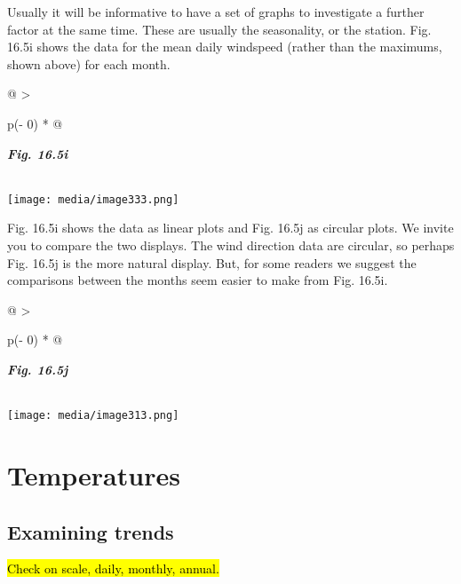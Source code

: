 \documentclass[
  letterpaper,
  DIV=11,
  numbers=noendperiod]{scrreprt}
\begin{document}
Usually it will be informative to have a set of graphs to investigate a
further factor at the same time. These are usually the seasonality, or
the station. Fig. 16.5i shows the data for the mean daily windspeed
(rather than the maximums, shown above) for each month.

\begin{longtable}[]{@{}
  >{\raggedright\arraybackslash}p{(\columnwidth - 0\tabcolsep) * }@{}}
\toprule\noalign{}
\begin{minipage}[b]{\linewidth}\raggedright
\textbf{\emph{Fig. 16.5i}}
\end{minipage} \\
\midrule\noalign{}
\endhead
\bottomrule\noalign{}
\endlastfoot
\texttt{[image: media/image333.png]} \\
\end{longtable}

Fig. 16.5i shows the data as linear plots and Fig. 16.5j as circular
plots. We invite you to compare the two displays. The wind direction
data are circular, so perhaps Fig. 16.5j is the more natural display.
But, for some readers we suggest the comparisons between the months seem
easier to make from Fig. 16.5i.

\begin{longtable}[]{@{}
  >{\raggedright\arraybackslash}p{(\columnwidth - 0\tabcolsep) * }@{}}
\toprule\noalign{}
\begin{minipage}[b]{\linewidth}\raggedright
\textbf{\emph{Fig. 16.5j}}
\end{minipage} \\
\midrule\noalign{}
\endhead
\bottomrule\noalign{}
\endlastfoot
\texttt{[image: media/image313.png]} \\
\end{longtable}


\chapter{Temperatures}\label{temperatures}

\section{Examining trends}\label{examining-trends}

\hl{Check on scale, daily, monthly, annual.}
\end{document}
